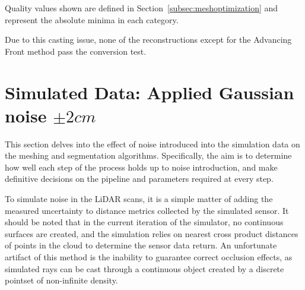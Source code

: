 \documentclass[12pt]{drexelthesis}
\let\Oldsection\section
\renewcommand{\section}{\FloatBarrier\Oldsection}
\begin{document}
\begin{table}[!ht]
	\centering
		\caption[Zero noise mesh exit quality]{Exit quality analysis of simulated zero noise surface mesh}
	Quality values shown are defined in Section~\ref{subsec:meshoptimization} and represent the absolute minima in each category.
	\label{table:0noisequality}
\end{table}

Due to this casting issue, none of the reconstructions except for the Advancing Front method pass the conversion test.











\section{Simulated Data: Applied Gaussian noise $\pm 2 cm$}

This section delves into the effect of noise introduced into the simulation data on the meshing and segmentation algorithms. Specifically, the aim is to determine how well each step of the process holds up to noise introduction, and make definitive decisions on the pipeline and parameters required at every step.

To simulate noise in the LiDAR scans, it is a simple matter of adding the measured uncertainty to distance metrics collected by the simulated sensor. It should be noted that in the current iteration of the simulator, no continuous surfaces are created, and the simulation relies on nearest cross product distances of points in the cloud to determine the sensor data return. An unfortunate artifact of this method is the inability to guarantee correct occlusion effects, as simulated rays can be cast through a continuous object created by a discrete pointset of non-infinite density.
\end{document}

